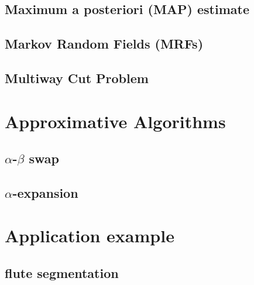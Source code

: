 \documentclass{beamer}
\begin{document}
\subsection{Maximum a posteriori (MAP) estimate}

\subsection{Markov Random Fields (MRFs)}

\subsection{Multiway Cut Problem}


\section{Approximative Algorithms}
\subsection{$\alpha$-$\beta$ swap}
\subsection{$\alpha$-expansion}

\section{Application example}
\subsection{flute segmentation}



	
	
	
\end{document}
